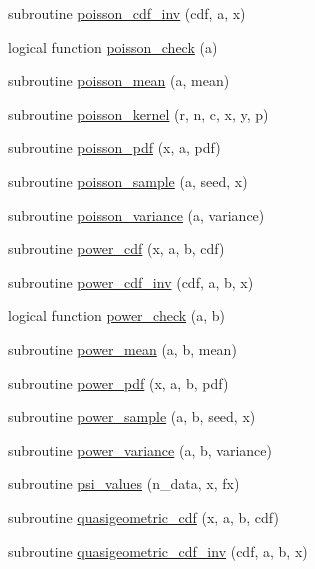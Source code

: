 \begin{DoxyCompactItemize}
\item 
subroutine \hyperlink{subroutines_8f_a006ebeb017e4f7eca24310e7d1d48ba6}{poisson\+\_\+cdf\+\_\+inv} (cdf, a, x)
\item 
logical function \hyperlink{subroutines_8f_ad5ff3a0c4c674bc96d6540e52c714551}{poisson\+\_\+check} (a)
\item 
subroutine \hyperlink{subroutines_8f_ad3501e0bdf09db56d382eeecdadc4527}{poisson\+\_\+mean} (a, mean)
\item 
subroutine \hyperlink{subroutines_8f_a98a27535cff1de1b8e0031ccb5821e5e}{poisson\+\_\+kernel} (r, n, c, x, y, p)
\item 
subroutine \hyperlink{subroutines_8f_af198c42c12a15059e2968d68eb27f389}{poisson\+\_\+pdf} (x, a, pdf)
\item 
subroutine \hyperlink{subroutines_8f_a7f8c43ba4d755c5e82a3559388c2cae9}{poisson\+\_\+sample} (a, seed, x)
\item 
subroutine \hyperlink{subroutines_8f_a33ab451e2813c47185e508089a51228d}{poisson\+\_\+variance} (a, variance)
\item 
subroutine \hyperlink{subroutines_8f_a80622de6b501cb3b7d068a80cb6ac064}{power\+\_\+cdf} (x, a, b, cdf)
\item 
subroutine \hyperlink{subroutines_8f_adc62d8b1d04a836c565406f798dbe564}{power\+\_\+cdf\+\_\+inv} (cdf, a, b, x)
\item 
logical function \hyperlink{subroutines_8f_a1b88b795db7eec8313c8f3fcf0e332e7}{power\+\_\+check} (a, b)
\item 
subroutine \hyperlink{subroutines_8f_aae67147542b531add7881395ab9b9aa5}{power\+\_\+mean} (a, b, mean)
\item 
subroutine \hyperlink{subroutines_8f_a001ee6b823fa4d4c5bc5c8f0a7e92bc4}{power\+\_\+pdf} (x, a, b, pdf)
\item 
subroutine \hyperlink{subroutines_8f_aade9130fea35054838514ae82f0fc6aa}{power\+\_\+sample} (a, b, seed, x)
\item 
subroutine \hyperlink{subroutines_8f_a37db6d376f844e99257c1b319ddbf6b0}{power\+\_\+variance} (a, b, variance)
\item 
subroutine \hyperlink{subroutines_8f_ae149433719bfb4e008585cb535e0a6d9}{psi\+\_\+values} (n\+\_\+data, x, fx)
\item 
subroutine \hyperlink{subroutines_8f_aab048bbbc5041ebb417d263ffe3e72ed}{quasigeometric\+\_\+cdf} (x, a, b, cdf)
\item 
subroutine \hyperlink{subroutines_8f_a810c63c1882371219cad270ca4181c25}{quasigeometric\+\_\+cdf\+\_\+inv} (cdf, a, b, x)

\end{DoxyCompactItemize}
